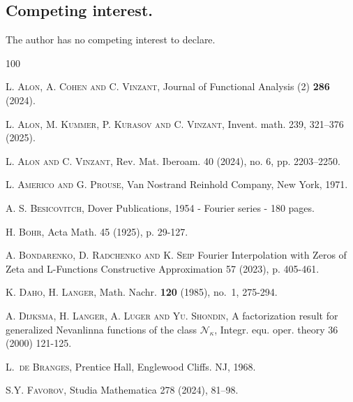 \documentclass[a4paper,reqno,12pt]{amsart}
\newcommand{\N}{\mathcal{N}}
\newcommand{\1}{{\bf 1}}
\begin{document}
\subsection*{Competing interest.} The author has no competing interest to declare.




\begin{thebibliography}{100}

\textsc{L. Alon, A. Cohen and C. Vinzant},
\newblock Journal of Functional Analysis (2) {\bf 286} (2024).


\textsc{L. Alon, M. Kummer, P. Kurasov and C. Vinzant},
\newblock Invent. math. 239, 321–376 (2025).


\textsc{L. Alon and C. Vinzant},
\newblock Rev. Mat. Iberoam. 40 (2024), no. 6, pp. 2203–2250.

\textsc{L. Americo and G. Prouse},
\newblock Van Nostrand Reinhold Company, New York, 1971.

\textsc{A. S. Besicovitch},
\newblock Dover Publications, 1954 - Fourier series - 180 pages.

\textsc{H. Bohr},
\newblock Acta Math. 45 (1925), p. 29-127.

\textsc{A. Bondarenko, D. Radchenko and K. Seip}
Fourier Interpolation with Zeros of Zeta and L-Functions
Constructive Approximation 57 (2023), p. 405-461.

\textsc{K. Daho, H. Langer},
\newblock Math. Nachr. {\bf 120} (1985), no.~1, 275-294.

\textsc{A. Dijksma, H. Langer, A. Luger and Yu. Shondin,}
A factorization result for generalized Nevanlinna functions of the class $\N_\kappa$, Integr. equ. oper. theory 36 (2000) 121-125.


\textsc{L.\ de Branges},
\newblock Prentice Hall, Englewood Cliffs. NJ, 1968.

\textsc{S.Y. Favorov},
\newblock Studia Mathematica 278 (2024), 81–98.


\end{thebibliography}
\end{document}
